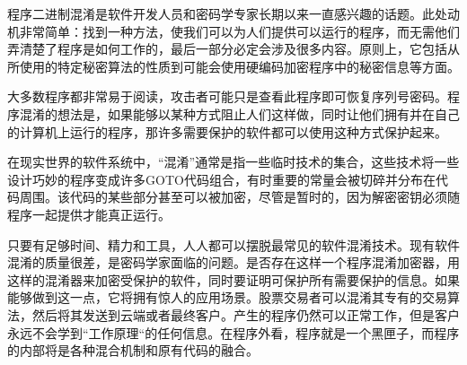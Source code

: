程序二进制混淆是软件开发人员和密码学专家长期以来一直感兴趣的话题。此处动机非常简单：找到一种方法，使我们可以为人们提供可以运行的程序，而无需他们弄清楚了程序是如何工作的，最后一部分必定会涉及很多内容\cite{钟林辉2020软件演化历史的逆向工程生成方法研究}。原则上，它包括从所使用的特定秘密算法的性质到可能会使用硬编码加密程序中的秘密信息等方面。



大多数程序都非常易于阅读，攻击者可能只是查看此程序即可恢复序列号密码\cite{徐君锋2017Android}。程序混淆的想法是，如果能够以某种方式阻止人们这样做，同时让他们拥有并在自己的计算机上运行的程序，那许多需要保护的软件都可以使用这种方式保护起来\cite{夏学云2019软件逆向工程技术分析}。

在现实世界的软件系统中，“混淆”通常是指一些临时技术的集合，这些技术将一些设计巧妙的程序变成许多GOTO代码组合，有时重要的常量会被切碎并分布在代码周围\cite{2020Malware}。该代码的某些部分甚至可以被加密，尽管是暂时的，因为解密密钥必须随程序一起提供才能真正运行\cite{2019Transforming}。



只要有足够时间、精力和工具\cite{2018Analysis}，人人都可以摆脱最常见的软件混淆技术\cite{2014A}。现有软件混淆的质量很差，是密码学家面临的问题。是否存在这样一个程序混淆加密器，用这样的混淆器来加密受保护的软件，同时要证明可保护所有需要保护的信息。如果能够做到这一点，它将拥有惊人的应用场景。股票交易者可以混淆其专有的交易算法\cite{2020Flow}，然后将其发送到云端或者最终客户。产生的程序仍然可以正常工作\cite{0Black}，但是客户永远不会学到“工作原理“的任何信息。在程序外看，程序就是一个黑匣子，而程序的内部将是各种混合机制和原有代码的融合\cite{2020A}。

